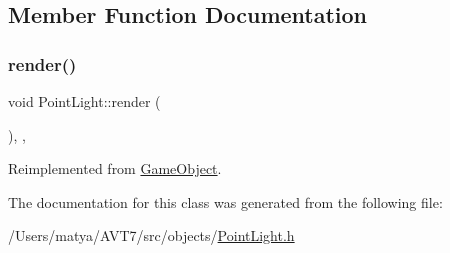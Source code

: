 \subsection{Member Function Documentation}
\mbox{\label{class_point_light_a4584cb5e40e5dd6ab2f43ec84851152c}} 
\subsubsection{\texorpdfstring{render()}{render()}}
{\footnotesize\ttfamily void Point\+Light\+::render (\begin{DoxyParamCaption}{ }\end{DoxyParamCaption})\hspace{0.3cm}{\ttfamily [inline]}, {\ttfamily [final]}, {\ttfamily [virtual]}}



Reimplemented from \hyperlink{class_game_object_a484efb66a7a27c101e84c11d9905d7a6}{Game\+Object}.



The documentation for this class was generated from the following file\+:\begin{DoxyCompactItemize}
\item 
/\+Users/matya/\+A\+V\+T7/src/objects/\hyperlink{_point_light_8h}{Point\+Light.\+h}\end{DoxyCompactItemize}
